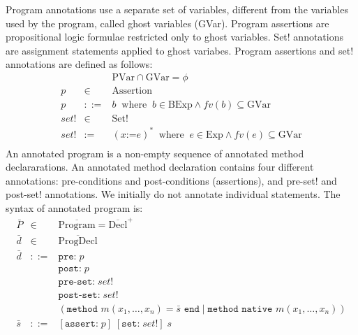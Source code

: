 \documentclass[10pt,notitlepage,twoside]{article}
\newcommand{\fv}{\mathit{fv}}
\begin{document}
Program annotations use a separate set of variables, different from the variables used by the program, called ghost variables (\textrm{GVar}).
Program assertions are propositional logic formulae restricted only to ghost variables. Set! annotations are assignment statements applied to ghost variabes.
Program assertions and set! annotations are defined as follows:
\begin{displaymath}
\begin{array}{rcl}
& & \textrm{PVar} \cap \textrm{GVar} = \phi \\
p & \in & \textrm{Assertion} \\
p & ::= & b \;\;\mbox{where}\;\;b \in \textrm{BExp} \wedge \fv(b) \subseteq \textrm{GVar}   \\
\mathit{set!} & \in & \textrm{Set!} \\
\mathit{set!} & := & (x \textrm{:=} e)^*\;\;\mbox{where}\;\; e \in \textrm{Exp} \wedge \fv(e) \subseteq \textrm{GVar} \\

\end{array}
\end{displaymath}
An annotated program is a non-empty sequence of annotated method declararations.
An annotated method declaration contains four different annotations: pre-conditions and post-conditions (assertions), and pre-set! and post-set! annotations.
We initially do not annotate individual statements.
The syntax of annotated program is:
\begin{displaymath}
\begin{array}{rcl}
\bar{P} & \in & \overline{\textrm{Program}} = \overline{\textrm{Decl}}^+ \\
\bar{d} & \in & \overline{\textrm{ProgDecl}}  \\
\bar{d} & ::= & \texttt{pre:}\;p\; \\
& & \texttt{post:}\;p\;   \\
& & \texttt{pre-set:}\;\mathit{set!}\;\\
& & \texttt{post-set:}\;\mathit{set!}\; \\
& & (\texttt{method } m(x_1,\ldots,x_n) = \bar{s} \texttt{ end} \mid \texttt{method } \texttt{native } m(x_1,\ldots,x_n)) \\
\bar{s} & ::= & [\texttt{assert:}\; p]\; [\texttt{set:} \;\mathit{set!}]\; s 
\end{array}
\end{displaymath}
\end{document}

